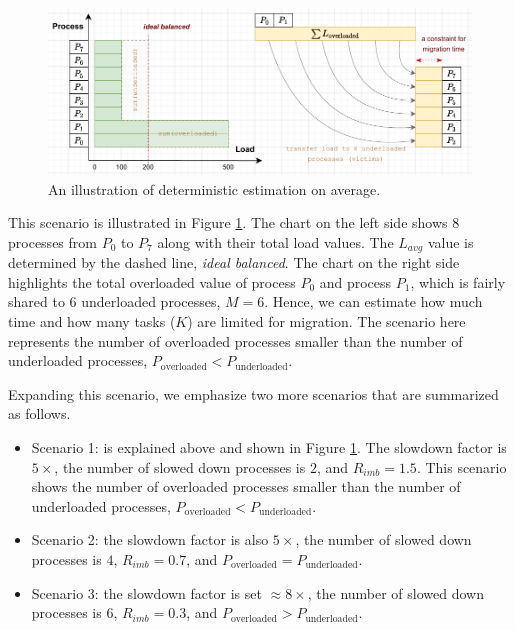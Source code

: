 \begin{figure}[t]
  \centering
  \includegraphics[scale=0.65]{./pictures/perf_analysis_model/perf_analysis_avg_bound_principle_case_1.5_two_sld_procs.pdf}
	\caption{An illustration of deterministic estimation on average.}
	\label{fig:explain_avg_bound_for_situation_1}
\end{figure}

This scenario is illustrated in Figure \ref{fig:explain_avg_bound_for_situation_1}. The chart on the left side shows $8$ processes from $P_{0}$ to $P_{7}$ along with their total load values. The $L_{avg}$ value is determined by the dashed line, \textit{ideal balanced}. The chart on the right side highlights the total overloaded value of process $P_{0}$ and process $P_{1}$, which is fairly shared to $6$ underloaded processes, $M=6$. Hence, we can estimate how much time and how many tasks ($K$) are limited for migration. The scenario here represents the number of overloaded processes smaller than the number of underloaded processes, $P_{\text{overloaded}} < P_{\text{underloaded}}$.\\

\newpage

Expanding this scenario, we emphasize two more scenarios that are summarized as follows.

\begin{itemize}
	\item Scenario 1: is explained above and shown in Figure \ref{fig:explain_avg_bound_for_situation_1}. The slowdown factor is $5\times$, the number of slowed down processes is $2$, and $R_{imb} = 1.5$. This scenario shows the number of overloaded processes smaller than the number of underloaded processes, $P_{\text{overloaded}} < P_{\text{underloaded}}$.
	\item Scenario 2: the slowdown factor is also $5\times$, the number of slowed down processes is $4$, $R_{imb} = 0.7$, and $P_{\text{overloaded}} = P_{\text{underloaded}}$.
	\item Scenario 3: the slowdown factor is set $\approx 8\times$, the number of slowed down processes is $6$, $R_{imb} = 0.3$, and $P_{\text{overloaded}} > P_{\text{underloaded}}$.
\end{itemize}

